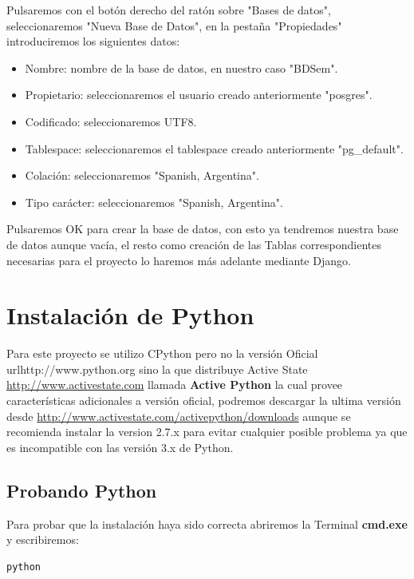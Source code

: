 Pulsaremos con el botón derecho del ratón sobre "Bases de datos", seleccionaremos "Nueva Base de Datos", en la pestaña "Propiedades" introduciremos los siguientes datos:

\begin{itemize}
    \item Nombre: nombre de la base de datos, en nuestro caso "BDSem".
    \item Propietario: seleccionaremos el usuario creado anteriormente "posgres".
    \item Codificado: seleccionaremos UTF8.
    \item Tablespace: seleccionaremos el tablespace creado anteriormente "pg\_default".
    \item Colación: seleccionaremos "Spanish, Argentina".
    \item Tipo carácter: seleccionaremos "Spanish, Argentina".
\end{itemize}

Pulsaremos OK para crear la base de datos, con esto ya tendremos nuestra base de datos aunque vacía, el resto como creación de las Tablas correspondientes necesarias para el proyecto lo haremos más adelante mediante Django.



\section{Instalación de Python}

Para este proyecto se utilizo CPython pero no la versión Oficial url{http://www.python.org} sino la que distribuye Active State \url{http://www.activestate.com} llamada {\bfseries Active Python} la cual provee características adicionales a versión oficial, podremos descargar la ultima versión desde  \url{http://www.activestate.com/activepython/downloads} aunque se recomienda instalar la version 2.7.x para evitar cualquier posible problema ya que es incompatible con las versión 3.x de Python.

\subsection{Probando Python}
Para probar que la instalación haya sido correcta abriremos la Terminal \textbf{cmd.exe} y escribiremos:

\begin{lstlisting}[style=consola, numbers=none]
    python
\end{lstlisting} 

